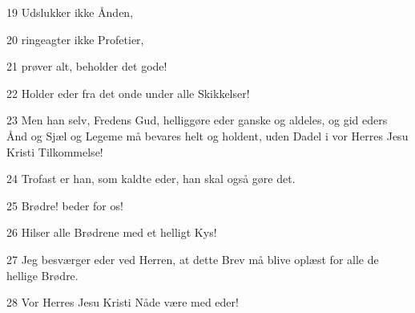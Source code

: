 \par 19 Udslukker ikke Ånden,
\par 20 ringeagter ikke Profetier,
\par 21 prøver alt, beholder det gode!
\par 22 Holder eder fra det onde under alle Skikkelser!
\par 23 Men han selv, Fredens Gud, helliggøre eder ganske og aldeles, og gid eders Ånd og Sjæl og Legeme må bevares helt og holdent, uden Dadel i vor Herres Jesu Kristi Tilkommelse!
\par 24 Trofast er han, som kaldte eder, han skal også gøre det.
\par 25 Brødre! beder for os!
\par 26 Hilser alle Brødrene med et helligt Kys!
\par 27 Jeg besværger eder ved Herren, at dette Brev må blive oplæst for alle de hellige Brødre.
\par 28 Vor Herres Jesu Kristi Nåde være med eder!



